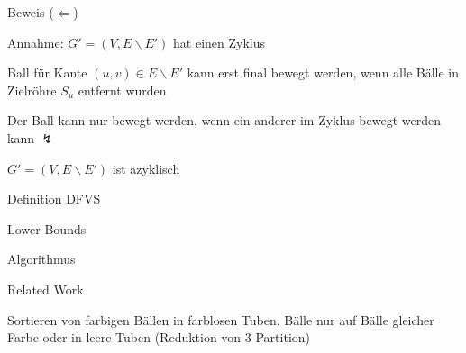 \documentclass{beamer}
\begin{document}
\begin{frame}{Beweis (\glqq $\Leftarrow$\grqq)}
\begin{pointlist}
\item Annahme: $G'=(V,E\backslash E')$ hat einen Zyklus
\item Ball für Kante $(u,v)\in E\backslash E'$ kann erst final bewegt werden, wenn alle Bälle in Zielröhre $S_u$ entfernt wurden
\item Der Ball kann nur bewegt werden, wenn ein anderer im Zyklus bewegt werden kann $\lightning$ 
\begin{arrowlist}
\item $G'=(V,E\backslash E')$ ist azyklisch 
\end{arrowlist}
\end{pointlist}
\begin{figure}
    \centering
    \qquad
\end{figure}
\end{frame}

\begin{frame}{Definition DFVS}
\end{frame}

\begin{frame}{Lower Bounds}
\end{frame}

\begin{frame}{Algorithmus}
\end{frame}

\begin{frame}{Related Work}
	\begin{pointlist}
		\item Sortieren von farbigen Bällen in farblosen Tuben. Bälle nur auf Bälle gleicher Farbe oder in leere Tuben (Reduktion von 3-Partition)
	\end{pointlist}
\end{frame}
\end{document}
